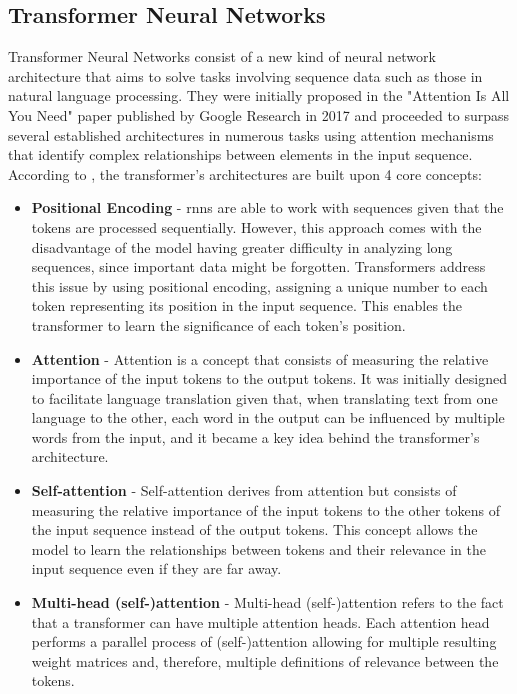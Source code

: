 \subsection{Transformer Neural Networks}
\label{subsection:transformer_neural_networks}

Transformer Neural Networks consist of a new kind of neural network architecture that aims to solve tasks involving sequence data such as those in natural language processing. They were initially proposed in the "Attention Is All You Need" paper published by Google Research in 2017 \cite{Vaswani2017} and proceeded to surpass several established architectures in numerous tasks using attention mechanisms that identify complex relationships between elements in the input sequence. According to \textcite{Transformer_Oreilly}, the transformer's architectures are built upon 4 core concepts: %
\begin{itemize}
    \item \textbf{Positional Encoding} - \acs{rnn}s are able to work with sequences given that the tokens are processed sequentially. However, this approach comes with the disadvantage of the model having greater difficulty in analyzing long sequences, since important data might be forgotten. Transformers address this issue by using positional encoding, assigning a unique number to each token representing its position in the input sequence. This enables the transformer to learn the significance of each token's position.
    
    \item \textbf{Attention} - Attention is a concept that consists of measuring the relative importance of the input tokens to the output tokens. It was initially designed to facilitate language translation given that, when translating text from one language to the other, each word in the output can be influenced by multiple words from the input, and it became a key idea behind the transformer's architecture.

    \item \textbf{Self-attention} - Self-attention derives from attention but consists of measuring the relative importance of the input tokens to the other tokens of the input sequence instead of the output tokens. This concept allows the model to learn the relationships between tokens and their relevance in the input sequence even if they are far away.

    \item \textbf{Multi-head (self-)attention} - Multi-head (self-)attention refers to the fact that a transformer can have multiple attention heads. Each attention head performs a parallel process of (self-)attention allowing for multiple resulting weight matrices and, therefore, multiple definitions of relevance between the tokens.
\end{itemize}

